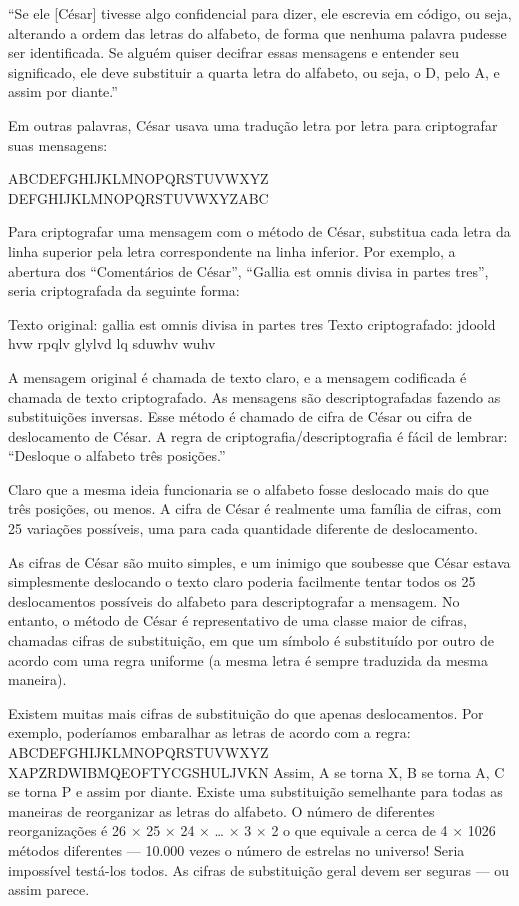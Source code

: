 \documentclass{book}
\begin{document}
%
``Se ele [César] tivesse algo confidencial para dizer, ele escrevia em código, ou seja, alterando a ordem das letras do alfabeto, de forma que nenhuma palavra pudesse ser identificada. Se alguém quiser decifrar essas mensagens e entender seu significado, ele deve substituir a quarta letra do alfabeto, ou seja, o D, pelo A, e assim por diante.''
%

Em outras palavras, César usava uma tradução letra por letra para criptografar suas mensagens:

%
ABCDEFGHIJKLMNOPQRSTUVWXYZ
DEFGHIJKLMNOPQRSTUVWXYZABC
%

Para criptografar uma mensagem com o método de César, substitua cada letra da linha superior pela letra correspondente na linha inferior. Por exemplo, a abertura dos ``Comentários de César'', ``Gallia est omnis divisa in partes tres'', seria criptografada da seguinte forma:

%
Texto original: gallia est omnis divisa in partes tres
Texto criptografado: jdoold hvw rpqlv glylvd lq sduwhv wuhv
%

A mensagem original é chamada de texto claro, e a mensagem codificada é chamada de texto criptografado. As mensagens são descriptografadas fazendo as substituições inversas. Esse método é chamado de cifra de César ou cifra de deslocamento de César. A regra de criptografia/descriptografia é fácil de lembrar: ``Desloque o alfabeto três posições.''

Claro que a mesma ideia funcionaria se o alfabeto fosse deslocado mais do que três posições, ou menos. A cifra de César é realmente uma família de cifras, com 25 variações possíveis, uma para cada quantidade diferente de deslocamento.

As cifras de César são muito simples, e um inimigo que soubesse que César estava simplesmente deslocando o texto claro poderia facilmente tentar todos os 25 deslocamentos possíveis do alfabeto para descriptografar a mensagem. No entanto, o método de César é representativo de uma classe maior de cifras, chamadas cifras de substituição, em que um símbolo é substituído por outro de acordo com uma regra uniforme (a mesma letra é sempre traduzida da mesma maneira).

Existem muitas mais cifras de substituição do que apenas deslocamentos. Por exemplo, poderíamos embaralhar as letras de acordo com a regra:
%
ABCDEFGHIJKLMNOPQRSTUVWXYZ
XAPZRDWIBMQEOFTYCGSHULJVKN
%
Assim, A se torna X, B se torna A, C se torna P e assim por diante. Existe uma substituição semelhante para todas as maneiras de reorganizar as letras do alfabeto. O número de diferentes reorganizações é
%
26 × 25 × 24 × … × 3 × 2
%
o que equivale a cerca de 4 × 1026 métodos diferentes --- 10.000 vezes o número de estrelas no universo! Seria impossível testá-los todos. As cifras de substituição geral devem ser seguras --- ou assim parece.
\end{document}
